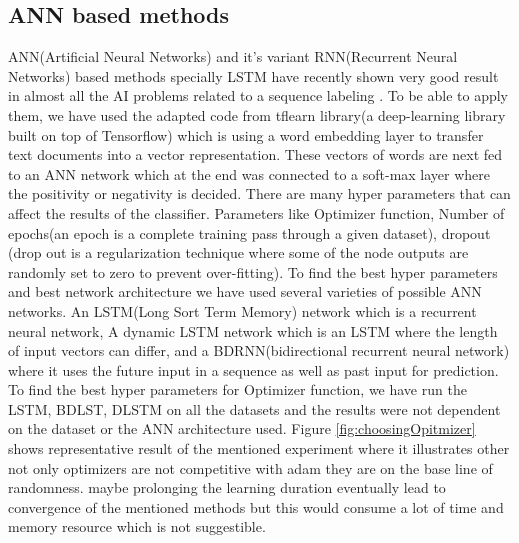 	\subsection*{ANN based methods}
	ANN(Artificial Neural Networks) and it's variant RNN(Recurrent Neural Networks) based methods specially LSTM have recently shown very good result in almost all the AI problems related to a sequence labeling \cite{Graves2012} \cite{UnreasonableRNN}. To be able to apply them, we have used the adapted code from tflearn library\cite{tflearn2016}(a deep-learning library built on top of Tensorflow\cite{tensorflow2015-whitepaper}) which is using a word embedding layer to transfer text documents into a vector representation. These vectors of words are next fed to an ANN network which at the end was connected to a soft-max layer where the positivity or negativity is decided. There are many hyper parameters that can affect the results of the classifier. Parameters like Optimizer function, Number of epochs(an epoch is a complete training pass through a given dataset), dropout (drop out is a regularization technique where some of the node outputs are randomly set to zero to prevent over-fitting). To find the best hyper parameters and best network architecture we have used several varieties of possible ANN networks. An LSTM(Long Sort Term Memory) network which is a recurrent neural network, A dynamic LSTM network which is an LSTM where the length of input vectors can differ, and a BDRNN(bidirectional recurrent neural network) where it uses the future input in a sequence as well as past input for prediction.\\ 
	To find the best hyper parameters for Optimizer function, we have run the LSTM, BDLST, DLSTM on all the datasets and the results were not dependent on the dataset or the ANN architecture used. Figure \ref{fig:choosingOpitmizer} shows representative result of the mentioned experiment where it illustrates other not only optimizers are not competitive with adam they are on the base line of randomness. maybe prolonging the learning duration eventually lead to convergence of the mentioned methods but this would consume a lot of time and memory resource which is not suggestible.\\

